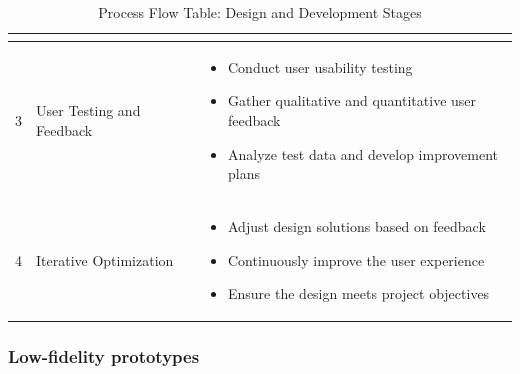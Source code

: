 \begin{table}[h!]
\begin{tabular}{|c|p{4cm}|p{10cm}|}
\begin{itemize}
                                                    \end{itemize}
                                                    \\ \hline
    3             & User Testing and Feedback & \begin{itemize}
                                                \item Conduct user usability
                                                testing
                                                \item Gather qualitative and
                                                quantitative user feedback
                                                \item Analyze test data and
                                            develop improvement plans
                                            \end{itemize}
                                            \\ \hline
    4             & Iterative Optimization       & \begin{itemize}
                                                    \item Adjust design
                                                    solutions based on feedback
                                                    \item Continuously improve
                                                    the user experience
                                                    \item Ensure the design
                                                meets project objectives
                                                \end{itemize}
                                                \\ \hline
    \end{tabular}
    \caption{Process Flow Table: Design and Development Stages}
    \label{tab:process_flow}
    \end{table}

\newpage{}

\subsubsection{Low-fidelity prototypes}

